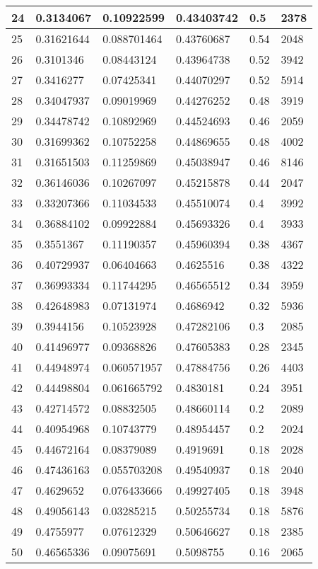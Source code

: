 \begin{longtable}{|l|l|l|l|l|l|}
24 & 0.3134067 & 0.10922599 & 0.43403742 & 0.5 & 2378 \\ \hline 
25 & 0.31621644 & 0.088701464 & 0.43760687 & 0.54 & 2048 \\ \hline 
26 & 0.3101346 & 0.08443124 & 0.43964738 & 0.52 & 3942 \\ \hline 
27 & 0.3416277 & 0.07425341 & 0.44070297 & 0.52 & 5914 \\ \hline 
28 & 0.34047937 & 0.09019969 & 0.44276252 & 0.48 & 3919 \\ \hline 
29 & 0.34478742 & 0.10892969 & 0.44524693 & 0.46 & 2059 \\ \hline 
30 & 0.31699362 & 0.10752258 & 0.44869655 & 0.48 & 4002 \\ \hline 
31 & 0.31651503 & 0.11259869 & 0.45038947 & 0.46 & 8146 \\ \hline 
32 & 0.36146036 & 0.10267097 & 0.45215878 & 0.44 & 2047 \\ \hline 
33 & 0.33207366 & 0.11034533 & 0.45510074 & 0.4 & 3992 \\ \hline 
34 & 0.36884102 & 0.09922884 & 0.45693326 & 0.4 & 3933 \\ \hline 
35 & 0.3551367 & 0.11190357 & 0.45960394 & 0.38 & 4367 \\ \hline 
36 & 0.40729937 & 0.06404663 & 0.4625516 & 0.38 & 4322 \\ \hline 
37 & 0.36993334 & 0.11744295 & 0.46565512 & 0.34 & 3959 \\ \hline 
38 & 0.42648983 & 0.07131974 & 0.4686942 & 0.32 & 5936 \\ \hline 
39 & 0.3944156 & 0.10523928 & 0.47282106 & 0.3 & 2085 \\ \hline 
40 & 0.41496977 & 0.09368826 & 0.47605383 & 0.28 & 2345 \\ \hline 
41 & 0.44948974 & 0.060571957 & 0.47884756 & 0.26 & 4403 \\ \hline 
42 & 0.44498804 & 0.061665792 & 0.4830181 & 0.24 & 3951 \\ \hline 
43 & 0.42714572 & 0.08832505 & 0.48660114 & 0.2 & 2089 \\ \hline 
44 & 0.40954968 & 0.10743779 & 0.48954457 & 0.2 & 2024 \\ \hline 
45 & 0.44672164 & 0.08379089 & 0.4919691 & 0.18 & 2028 \\ \hline 
46 & 0.47436163 & 0.055703208 & 0.49540937 & 0.18 & 2040 \\ \hline 
47 & 0.4629652 & 0.076433666 & 0.49927405 & 0.18 & 3948 \\ \hline 
48 & 0.49056143 & 0.03285215 & 0.50255734 & 0.18 & 5876 \\ \hline 
49 & 0.4755977 & 0.07612329 & 0.50646627 & 0.18 & 2385 \\ \hline 
50 & 0.46565336 & 0.09075691 & 0.5098755 & 0.16 & 2065 \\ \hline 
\end{longtable}